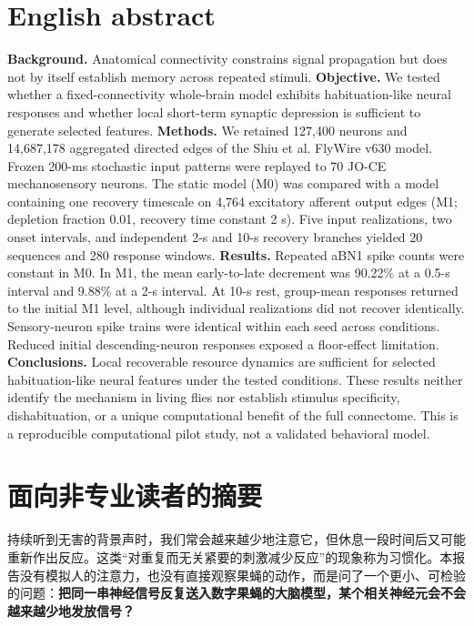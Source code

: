 \documentclass[UTF8,a4paper,zihao=-4,fontset=none]{ctexart}
\begin{document}
\section*{English abstract}
\begin{small}
\noindent\textbf{Background.} Anatomical connectivity constrains signal propagation but does not by itself establish memory across repeated stimuli.
\textbf{Objective.} We tested whether a fixed-connectivity whole-brain model exhibits habituation-like neural responses and whether local short-term synaptic depression is sufficient to generate selected features.
\textbf{Methods.} We retained 127,400 neurons and 14,687,178 aggregated directed edges of the Shiu et al. FlyWire v630 model. Frozen 200-ms stochastic input patterns were replayed to 70 JO-CE mechanosensory neurons. The static model (M0) was compared with a model containing one recovery timescale on 4,764 excitatory afferent output edges (M1; depletion fraction 0.01, recovery time constant 2 s). Five input realizations, two onset intervals, and independent 2-s and 10-s recovery branches yielded 20 sequences and 280 response windows.
\textbf{Results.} Repeated aBN1 spike counts were constant in M0. In M1, the mean early-to-late decrement was 90.22\% at a 0.5-s interval and 9.88\% at a 2-s interval. At 10-s rest, group-mean responses returned to the initial M1 level, although individual realizations did not recover identically. Sensory-neuron spike trains were identical within each seed across conditions. Reduced initial descending-neuron responses exposed a floor-effect limitation.
\textbf{Conclusions.} Local recoverable resource dynamics are sufficient for selected habituation-like neural features under the tested conditions. These results neither identify the mechanism in living flies nor establish stimulus specificity, dishabituation, or a unique computational benefit of the full connectome. This is a reproducible computational pilot study, not a validated behavioral model.
\end{small}

\section*{面向非专业读者的摘要}
持续听到无害的背景声时，我们常会越来越少地注意它，但休息一段时间后又可能重新作出反应。这类“对重复而无关紧要的刺激减少反应”的现象称为习惯化。本报告没有模拟人的注意力，也没有直接观察果蝇的动作，而是问了一个更小、可检验的问题：\textbf{把同一串神经信号反复送入数字果蝇的大脑模型，某个相关神经元会不会越来越少地发放信号？}
\end{document}
